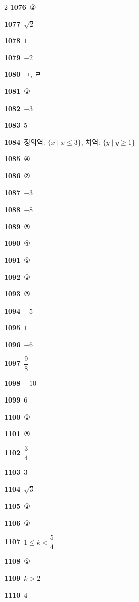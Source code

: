 \documentclass[10pt,a4paper]{article}
\begin{document}
\begin{multicols}{2}
\noindent\textbf{1076}\ ②\par
\noindent\textbf{1077}\ $\sqrt{2}$\par
\noindent\textbf{1078}\ $1$\par
\noindent\textbf{1079}\ $-2$\par
\noindent\textbf{1080}\ ㄱ, ㄹ\par
\noindent\textbf{1081}\ ③\par
\noindent\textbf{1082}\ $-3$\par
\noindent\textbf{1083}\ $5$\par
\noindent\textbf{1084}\ 정의역: $\{x \mid x\le 3\}$, 치역: $\{y \mid y\ge 1\}$\par
\noindent\textbf{1085}\ ④\par
\noindent\textbf{1086}\ ②\par
\noindent\textbf{1087}\ $-3$\par
\noindent\textbf{1088}\ $-8$\par
\noindent\textbf{1089}\ ⑤\par
\noindent\textbf{1090}\ ④\par
\noindent\textbf{1091}\ ⑤\par
\noindent\textbf{1092}\ ③\par
\noindent\textbf{1093}\ ③\par
\noindent\textbf{1094}\ $-5$\par
\noindent\textbf{1095}\ $1$\par
\noindent\textbf{1096}\ $-6$\par
\noindent\textbf{1097}\ $\dfrac{9}{8}$\par
\noindent\textbf{1098}\ $-10$\par
\noindent\textbf{1099}\ $6$\par
\noindent\textbf{1100}\ ①\par
\noindent\textbf{1101}\ ⑤\par
\noindent\textbf{1102}\ $\dfrac{3}{4}$\par
\noindent\textbf{1103}\ $3$\par
\noindent\textbf{1104}\ $\sqrt{3}$\par
\noindent\textbf{1105}\ ②\par
\noindent\textbf{1106}\ ②\par
\noindent\textbf{1107}\ $1\le k<\dfrac{5}{4}$\par
\noindent\textbf{1108}\ ⑤\par
\noindent\textbf{1109}\ $k>2$\par
\noindent\textbf{1110}\ $4$\par

\end{multicols}
\end{document}
